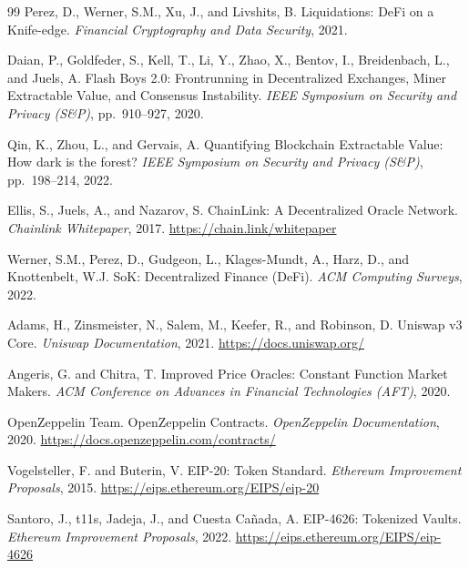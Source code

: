 \documentclass[10pt,a4paper,twocolumn]{article}
\theoremstyle{definition}
\theoremstyle{plain}
\theoremstyle{remark}
\begin{document}
\begin{thebibliography}{99}
Perez, D., Werner, S.M., Xu, J., and Livshits, B.
\newblock Liquidations: DeFi on a Knife-edge.
\newblock \emph{Financial Cryptography and Data Security}, 2021.

Daian, P., Goldfeder, S., Kell, T., Li, Y., Zhao, X., Bentov, I., Breidenbach, L., and Juels, A.
\newblock Flash Boys 2.0: Frontrunning in Decentralized Exchanges, Miner Extractable Value, and Consensus Instability.
\newblock \emph{IEEE Symposium on Security and Privacy (S\&P)}, pp.~910--927, 2020.

Qin, K., Zhou, L., and Gervais, A.
\newblock Quantifying Blockchain Extractable Value: How dark is the forest?
\newblock \emph{IEEE Symposium on Security and Privacy (S\&P)}, pp.~198--214, 2022.

Ellis, S., Juels, A., and Nazarov, S.
\newblock ChainLink: A Decentralized Oracle Network.
\newblock \emph{Chainlink Whitepaper}, 2017.
\newblock \url{https://chain.link/whitepaper}

Werner, S.M., Perez, D., Gudgeon, L., Klages-Mundt, A., Harz, D., and Knottenbelt, W.J.
\newblock SoK: Decentralized Finance (DeFi).
\newblock \emph{ACM Computing Surveys}, 2022.

Adams, H., Zinsmeister, N., Salem, M., Keefer, R., and Robinson, D.
\newblock Uniswap v3 Core.
\newblock \emph{Uniswap Documentation}, 2021.
\newblock \url{https://docs.uniswap.org/}

Angeris, G. and Chitra, T.
\newblock Improved Price Oracles: Constant Function Market Makers.
\newblock \emph{ACM Conference on Advances in Financial Technologies (AFT)}, 2020.

OpenZeppelin Team.
\newblock OpenZeppelin Contracts.
\newblock \emph{OpenZeppelin Documentation}, 2020.
\newblock \url{https://docs.openzeppelin.com/contracts/}

Vogelsteller, F. and Buterin, V.
\newblock EIP-20: Token Standard.
\newblock \emph{Ethereum Improvement Proposals}, 2015.
\newblock \url{https://eips.ethereum.org/EIPS/eip-20}

Santoro, J., t11s, Jadeja, J., and Cuesta Ca\~{n}ada, A.
\newblock EIP-4626: Tokenized Vaults.
\newblock \emph{Ethereum Improvement Proposals}, 2022.
\newblock \url{https://eips.ethereum.org/EIPS/eip-4626}


\end{thebibliography}
\end{document}
